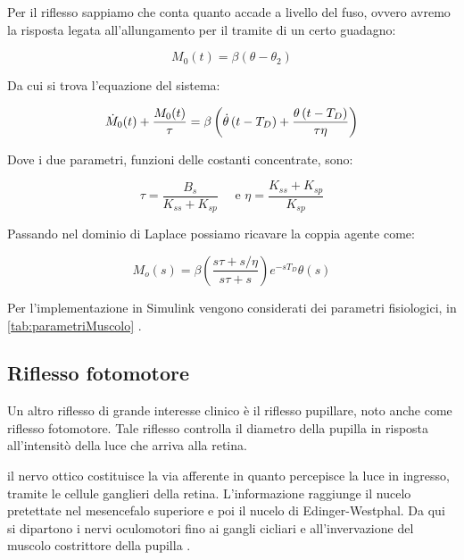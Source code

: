 Per il riflesso sappiamo che conta quanto accade a livello del fuso, ovvero avremo la risposta legata all'allungamento per il tramite di un certo guadagno:

\begin{equation}
	M_{0}(t)=\beta\left(\theta-\theta_{2}\right)
\end{equation}

Da cui si trova l'equazione del sistema:

\begin{equation}
	\small{\dot{M}_{0}(t)+\frac{M_{0}(t)}{\tau}=\beta\left(\dot{\theta}\left(t-T_{D}\right)+\frac{\theta\left(t-T_{D}\right)}{\tau \eta}\right)}
\end{equation}

Dove i due parametri, funzioni delle costanti concentrate, sono:

\begin{equation}
	\tau=\frac{B_{s}}{K_{s s}+K_{s p}} \quad \text { e } \eta=\frac{K_{s s}+K_{s p}}{K_{s p}}
\end{equation}

Passando nel dominio di Laplace possiamo ricavare la coppia agente come:

\begin{equation}
	M_{o}(s)=\beta\left(\frac{s \tau+s / \eta}{s \tau+s}\right) e^{-s T_{D}} \theta(s)
\end{equation}

Per l'implementazione in Simulink vengono considerati dei parametri fisiologici, in \cref{tab:parametriMuscolo} \cite{khoo_physiological_2018,soechting_evaluation_1971}. 





\subsection{Riflesso fotomotore}


Un altro riflesso di grande interesse clinico è il riflesso pupillare, noto anche come riflesso fotomotore. Tale riflesso controlla il diametro della pupilla in risposta all'intensitò della luce che arriva alla retina.

il nervo ottico costituisce la via afferente in quanto percepisce la luce in ingresso, tramite  le cellule ganglieri della retina. L'informazione raggiunge il nucelo pretettate nel mesencefalo superiore e poi il nucelo di Edinger-Westphal. Da qui si dipartono i nervi oculomotori fino ai gangli cicliari e all'invervazione del muscolo costrittore della pupilla \cite{kandel_principles_2021}.

